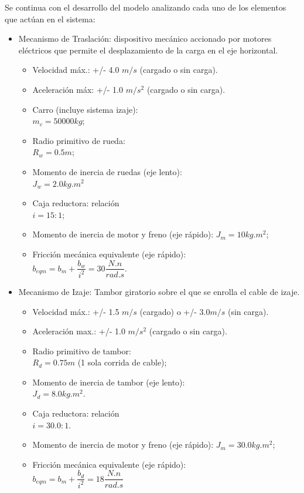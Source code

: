 \documentclass[journal]{IEEEtran}
\begin{document}
Se continua con el desarrollo del modelo analizando cada uno de
los elementos que actúan en el sistema:
\begin{itemize}
 \item Mecanismo de Traslación: dispositivo mecánico
 accionado por motores eléctricos que permite el 
 desplazamiento de la carga en el eje horizontal.
 \begin{itemize}
  \item Velocidad máx.: +/- 4.0 $m/s$ (cargado o sin carga).
  \item Aceleración máx: +/- 1.0 $m/s^2$ (cargado o sin carga).
  \item Carro (incluye sistema izaje):\\ 
  $m_c=50000 kg$;
  \item Radio primitivo de rueda: \\
  $R_w = 0.5 m$;
  \item Momento de inercia de ruedas (eje lento):\\ 
  $J_w = 2.0 kg.m^2$ 
  \item Caja reductora: relación \\
  $i=15:1$;
  \item Momento de inercia de motor y freno (eje rápido): 
  $J_m = 10 kg.m^2$;
  \item Fricción mecánica equivalente (eje rápido):\\
  $b_{eqm}=b_m+\dfrac{b_w}{i^2}=30 \dfrac{N.n}{rad.s}$.
 \end{itemize}

 \item Mecanismo de Izaje: Tambor giratorio sobre 
 el que se enrolla el cable de izaje.
 \begin{itemize}
  \item Velocidad máx.: +/- 1.5 $m/s$ (cargado) o +/- $3.0 m/s$ (sin carga).
  \item Aceleración max.: +/- 1.0 $m/s^2$ (cargado o sin carga).
  \item Radio primitivo de tambor: \\
  $R_d = 0.75 m$ (1 sola corrida de cable);
  \item Momento de inercia de tambor (eje lento):\\
  $J_d = 8.0 kg.m^2$.
  \item Caja reductora: relación \\
  $i=30.0:1$.
  \item Momento de inercia de motor y freno (eje rápido): $J_m = 30.0 kg.m^2$;
  \item Fricción mecánica equivalente (eje rápido):\\ 
  $b_{eqm}=b_m+\dfrac{b_d}{i^2}=18 \dfrac{N.n}{rad.s}$
 \end{itemize}


\end{itemize}
\end{document}
